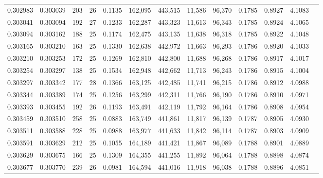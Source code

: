 \begin{tabular}{rrrrrrrrrrrrr}
0.302983 & 0.303039 &   203 &  26 &                                     0.1135 & 162,095 & 443,515 &  11,586 &  96,370 & 0.1785 & 0.8927 & 4.1083 \\
0.303041 & 0.303094 &   192 &  27 &                                     0.1233 & 162,287 & 443,323 &  11,613 &  96,343 & 0.1785 & 0.8924 & 4.1065 \\
0.303094 & 0.303162 &   188 &  25 &                                     0.1174 & 162,475 & 443,135 &  11,638 &  96,318 & 0.1785 & 0.8922 & 4.1048 \\
0.303165 & 0.303210 &   163 &  25 &                                     0.1330 & 162,638 & 442,972 &  11,663 &  96,293 & 0.1786 & 0.8920 & 4.1033 \\
0.303210 & 0.303253 &   172 &  25 &                                     0.1269 & 162,810 & 442,800 &  11,688 &  96,268 & 0.1786 & 0.8917 & 4.1017 \\
0.303254 & 0.303297 &   138 &  25 &                                     0.1534 & 162,948 & 442,662 &  11,713 &  96,243 & 0.1786 & 0.8915 & 4.1004 \\
0.303297 & 0.303342 &   177 &  28 &                                     0.1366 & 163,125 & 442,485 &  11,741 &  96,215 & 0.1786 & 0.8912 & 4.0988 \\
0.303344 & 0.303389 &   174 &  25 &                                     0.1256 & 163,299 & 442,311 &  11,766 &  96,190 & 0.1786 & 0.8910 & 4.0971 \\
0.303393 & 0.303455 &   192 &  26 &                                     0.1193 & 163,491 & 442,119 &  11,792 &  96,164 & 0.1786 & 0.8908 & 4.0954 \\
0.303459 & 0.303510 &   258 &  25 &                                     0.0883 & 163,749 & 441,861 &  11,817 &  96,139 & 0.1787 & 0.8905 & 4.0930 \\
0.303511 & 0.303588 &   228 &  25 &                                     0.0988 & 163,977 & 441,633 &  11,842 &  96,114 & 0.1787 & 0.8903 & 4.0909 \\
0.303591 & 0.303629 &   212 &  25 &                                     0.1055 & 164,189 & 441,421 &  11,867 &  96,089 & 0.1788 & 0.8901 & 4.0889 \\
0.303629 & 0.303675 &   166 &  25 &                                     0.1309 & 164,355 & 441,255 &  11,892 &  96,064 & 0.1788 & 0.8898 & 4.0874 \\
0.303677 & 0.303770 &   239 &  26 &                                     0.0981 & 164,594 & 441,016 &  11,918 &  96,038 & 0.1788 & 0.8896 & 4.0851 \\

\end{tabular}
